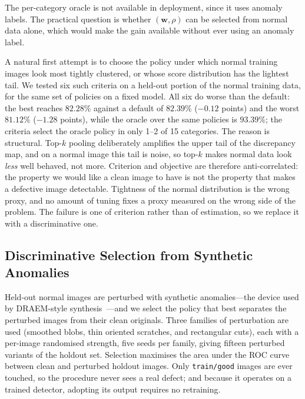 The per-category oracle is not available in deployment, since it uses anomaly
labels. The practical question is whether $(\mathbf{w},\rho)$ can be selected
from normal data alone, which would make the gain available without ever using an anomaly label.

A natural first attempt is to choose the policy under which normal training images
look most tightly clustered, or whose score distribution has the lightest tail. We
tested six such criteria on a held-out portion of the normal training data, for the
same set of policies on a fixed model. All six do worse than the default: the best
reaches $82.28\%$ against a default of $82.39\%$ ($-0.12$ points) and the worst
$81.12\%$ ($-1.28$ points), while the oracle over the same policies is $93.39\%$;
the criteria select the oracle policy in only 1--2 of 15 categories. The reason is
structural. Top-$k$ pooling deliberately amplifies the upper tail of the
discrepancy map, and on a normal image this tail is noise, so top-$k$ makes normal
data look \emph{less} well behaved, not more. Criterion and objective are therefore
anti-correlated: the property we would like a clean image to have is not the
property that makes a defective image detectable. Tightness of the normal
distribution is the wrong proxy, and no amount of tuning fixes a proxy measured on
the wrong side of the problem. The failure is one of criterion rather than of
estimation, so we replace it with a discriminative one.

\subsection{Discriminative Selection from Synthetic Anomalies}
\label{subsec:pseudo_results}

Held-out normal images are perturbed with synthetic anomalies---the device used
by DRAEM-style synthesis~\cite{zavrtanik2021draem}---and we select the policy
that best separates the perturbed images from their clean originals. Three
families of perturbation are used (smoothed blobs, thin oriented scratches, and
rectangular cuts), each with a per-image randomised strength, five seeds per
family, giving fifteen perturbed variants of the holdout set. Selection maximises
the area under the ROC curve between clean and perturbed holdout images. Only
\texttt{train/good} images are ever touched, so the procedure never sees a real
defect; and because it operates on a trained detector, adopting its output
requires no retraining.

